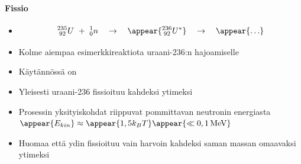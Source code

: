\begin{frame}
\frametitle{\texorpdfstring{\culine[\sectiontitleulinecolor]{\sectiontitle}}{\sectiontitle} }
\framesubtitle{Fissio}
\appear{}

\begin{itemize}
\item[] \[
{ }_{\;92}^{235} U ~ + ~ { }_{0}^{1} n \quad \rightarrow \quad\appear{{ }_{\;92}^{236} U^{*}} \quad \rightarrow \quad \appear{\ldots}
\]
	\item Kolme aiempaa esimerkkireaktiota uraani-236:n hajoamiselle  
	
	\item %
	Käytännössä on  %
	
	\item Yleisesti uraani-236 fissioituu kahdeksi ytimeksi
	
	\item  Prosessin yksityiskohdat riippuvat pommittavan neutronin energiasta \appear{(}$\appear{E_{kin}} \approx \appear{1,5 k_B T} \appear{\ll 0,1 \text{\,MeV}}$\appear{)}   
	
	\item Huomaa että ydin fissioituu vain harvoin kahdeksi saman massan omaavaksi ytimeksi 

\end{itemize}

\endofslide 
\end{frame}

